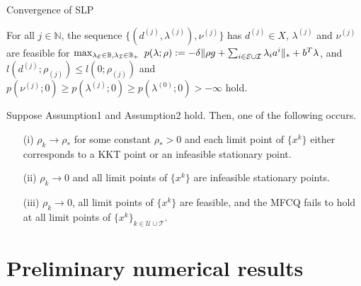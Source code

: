 \documentclass[8pt]{beamer}
\begin{document}
	\begin{frame}{Convergence of SLP}
		\begin{assumption}
			For all $j \in \mathbb{N}$, the sequence $\{(d^{(j)},\lambda^{(j)}), \nu^{(j)}\}$ has $d^{(j)} \in X$, $\lambda^{(j)}$ and $\nu^{(j)}$ are feasible for $\max_{\lambda_{{\cal E}} \in \mathbb{B}, \lambda_{{\cal I}}\in\mathbb{B}_+}\ p(\lambda; \rho):= -  \delta\|\rho g+\sum_{i\in{\cal E}\cup{\cal I}}\lambda_i a^i \|_* + b^T \lambda$,  and  $l(d^{(j)}; \rho_{(j)}) \leq l(0; \rho_{(j)}) $ and $p(\nu^{(j)}; 0) \geq p(\lambda^{(j)}; 0) \geq p(\lambda^{(0)}; 0) > - \infty$ hold.
		\end{assumption}
		\vfill
		\begin{theorem}  Suppose Assumption1 and Assumption2 hold. Then, one of the following occurs.
		\begin{enumerate}
			\item[(i)]  $\rho_k \to \rho_*$ for some constant $\rho_*>0$ and each limit point of $\{x^k\}$ either corresponds to a KKT point or an infeasible stationary point.
			\item[(ii)] $\rho_k \to 0$ and all limit points of $\{x^k\}$ are infeasible stationary points.
			\item[(iii)]  $\rho_k \to 0$, all limit points of $\{x^k\}$ are feasible, and the MFCQ fails to hold at all limit points of $\{x^k\}_{k\in\mathcal{U} \cup\mathcal{T}}$.			
		\end{enumerate}\end{theorem}
	\end{frame}

\section{Preliminary numerical results}

	
			
\end{document}
